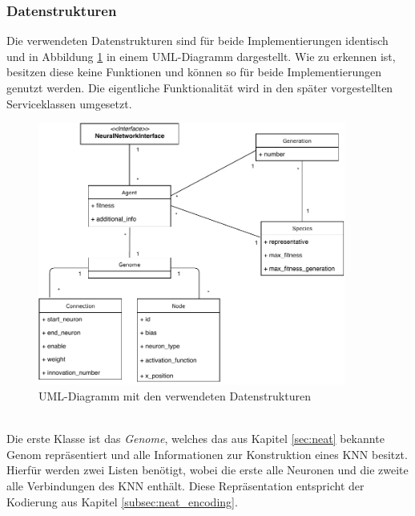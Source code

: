 \subsubsection{Datenstrukturen}
\label{subsubsec:data_structures}
Die verwendeten Datenstrukturen sind für beide Implementierungen identisch und in Abbildung \ref{fig:class_diagramm} in einem UML-Diagramm dargestellt. Wie zu erkennen ist, besitzen diese keine Funktionen und können so für beide Implementierungen genutzt werden. Die eigentliche Funktionalität wird in den später vorgestellten Serviceklassen umgesetzt.
\begin{figure}[!h]
	\centering
	\includegraphics[width=0.9\textwidth]{./img/uml/class_diagramm.pdf} 
	\caption{UML-Diagramm mit den verwendeten Datenstrukturen}
	\label{fig:class_diagramm}
\end{figure}
\\ \noindent
Die erste Klasse ist das \emph{Genome}, welches das aus Kapitel \ref{sec:neat} bekannte Genom repräsentiert und alle Informationen zur Konstruktion eines \ac{KNN} besitzt. Hierfür werden zwei Listen benötigt, wobei die erste alle Neuronen und die zweite alle Verbindungen des \ac{KNN} enthält. Diese Repräsentation entspricht der Kodierung aus Kapitel \ref{subsec:neat_encoding}. 
\\\\
